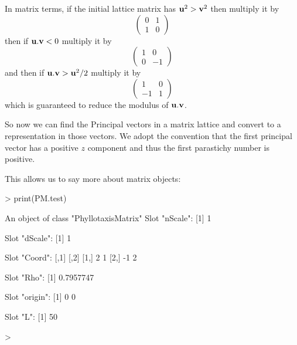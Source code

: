 \documentclass[a4paper]{article}
\newcommand{\uvec}{{\bf u}}
\newcommand{\vvec}{{\bf v}}
\begin{document}
In matrix terms, if the initial lattice matrix has $\uvec^2>\vvec^2$ then multiply it by
\[
\left( \begin{array}{ll}0 & 1 \\ 1 & 0 \end{array}\right)
\]
then if $\uvec.\vvec<0$ multiply it by
\[
\left( \begin{array}{ll} 1 & 0  \\ 0 & -1 \end{array}\right)
\]
and then if $\uvec.\vvec>\uvec^2/2$ multiply it by
\[
\left( \begin{array}{ll} 1 & 0  \\ -1 & 1\end{array}  \right)
\]
which is guaranteed to reduce the modulus of $\uvec.\vvec$.

So now we can find the Principal vectors in a matrix lattice and convert to a representation
in those vectors. We adopt the convention that the first principal vector has a positive $z$ component and thus the first parastichy number is positive.


This allows us to say more about matrix objects:
\begin{Schunk}
\begin{Sinput}
> print(PM.test)
\end{Sinput}
\begin{Soutput}
An object of class "PhyllotaxisMatrix"
Slot "nScale":
[1] 1

Slot "dScale":
[1] 1

Slot "Coord":
     [,1] [,2]
[1,]    2    1
[2,]   -1    2

Slot "Rho":
[1] 0.7957747

Slot "origin":
[1] 0 0

Slot "L":
[1] 50
\end{Soutput}
\begin{Sinput}
> 
\end{Sinput}
\end{Schunk}
\end{document}
